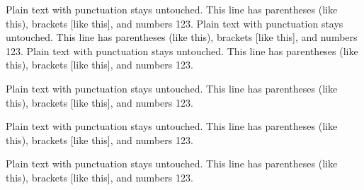Plain text with punctuation stays untouched.
This line has parentheses (like this), brackets [like this], and numbers 123.
Plain text with punctuation stays untouched.
This line has parentheses (like this), brackets [like this], and numbers 123.
Plain text with punctuation stays untouched.
This line has parentheses (like this), brackets [like this], and numbers 123.
\begin{frame}[t]
Plain text with punctuation stays untouched.
This line has parentheses (like this), brackets [like this], and numbers 123.
\end{frame}

\begin{frame}[t]
Plain text with punctuation stays untouched.
This line has parentheses (like this), brackets [like this], and numbers 123.
\end{frame}

\begin{frame}[t]
Plain text with punctuation stays untouched.
This line has parentheses (like this), brackets [like this], and numbers 123.
\end{frame}

